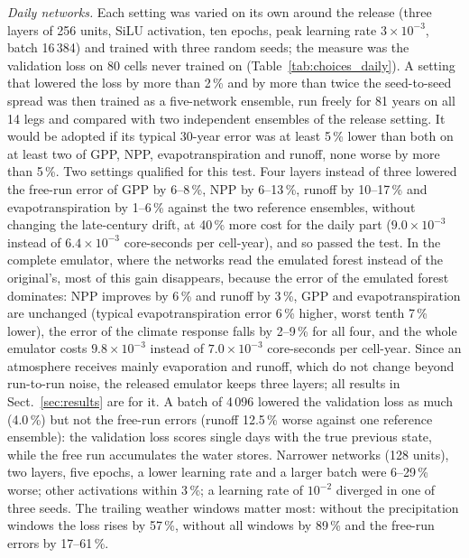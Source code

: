 \documentclass[11pt,a4paper]{article}
\begin{document}
\emph{Daily networks.} Each setting was varied on its own around the release (three layers of 256 units, SiLU
activation, ten epochs, peak learning rate $3\times10^{-3}$, batch 16\,384) and trained with three random seeds; the
measure was the validation loss on 80 cells never trained on (Table~\ref{tab:choices_daily}). A setting that lowered
the loss by more than 2\,\% and by more than twice the seed-to-seed spread was then trained as a five-network
ensemble, run freely for 81 years on all 14 legs and compared with two independent ensembles of the release setting.
It would be adopted if its typical 30-year error was at least 5\,\% lower than both on at least two of GPP, NPP,
evapotranspiration and runoff, none worse by more than 5\,\%. Two settings qualified for this test. Four layers
instead of three lowered the free-run error of GPP by 6--8\,\%, NPP by 6--13\,\%, runoff by 10--17\,\% and
evapotranspiration by 1--6\,\% against the two reference ensembles, without changing the late-century drift, at
40\,\% more cost for the daily part ($9.0\times10^{-3}$ instead of $6.4\times10^{-3}$ core-seconds per cell-year),
and so passed the test. In the complete emulator, where the networks read the emulated forest instead of the
original's, most of this gain disappears, because the error of the emulated forest dominates: NPP improves by 6\,\%
and runoff by 3\,\%, GPP and evapotranspiration are unchanged (typical evapotranspiration error 6\,\% higher, worst
tenth 7\,\% lower), the error of the climate response falls by 2--9\,\% for all four, and the whole emulator costs
$9.8\times10^{-3}$ instead of $7.0\times10^{-3}$ core-seconds per cell-year. Since an atmosphere receives mainly
evaporation and runoff, which do not change beyond run-to-run noise, the released emulator keeps three layers; all
results in Sect.~\ref{sec:results} are for it. A batch of 4\,096 lowered the validation loss as much (4.0\,\%) but not the free-run errors (runoff
12.5\,\% worse against one reference ensemble): the validation loss scores single days with the true previous state,
while the free run accumulates the water stores. Narrower networks (128 units), two layers, five epochs, a lower
learning rate and a larger batch were 6--29\,\% worse; other activations within 3\,\%; a learning rate of
$10^{-2}$ diverged in one of three seeds. The trailing weather windows matter most: without the precipitation windows
the loss rises by 57\,\%, without all windows by 89\,\% and the free-run errors by 17--61\,\%.
\end{document}
